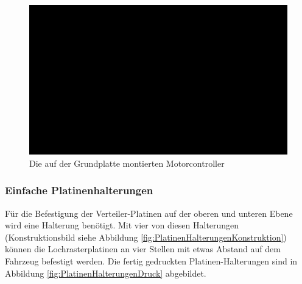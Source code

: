 \begin{figure}[H] %
\includegraphics[width=.85\textwidth]{sec2/images/3DAnbaukomponenten/Montagebilder/MotorcontrollerHalterungMontage} 
\centering
\captionsetup{width=.95\textwidth}
\caption[Die auf der Grundplatte montierten Motorcontroller]{Die auf der Grundplatte montierten Motorcontroller}
\centering
\label{fig:MotorcontrollerHalterungMontage}
\end{figure}

\newpage

\subsubsection{Einfache Platinenhalterungen}\label{Sec2Sub2SubSub5}

Für die Befestigung der Verteiler-Platinen auf der oberen und unteren Ebene wird eine Halterung benötigt. Mit vier von diesen Halterungen (Konstruktionsbild siehe Abbildung \ref{fig:PlatinenHalterungenKonstruktion}) können die Lochrasterplatinen an vier Stellen mit etwas Abstand auf dem Fahrzeug befestigt werden. Die fertig gedruckten Platinen-Halterungen sind in Abbildung \ref{fig:PlatinenHalterungenDruck} abgebildet.

